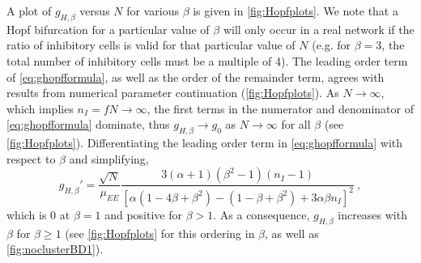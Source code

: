 \documentclass[reqno]{siamonline190516}
\begin{document}
A plot of $g_{H,\beta}$ versus $N$ for various $\beta$ is given in \cref{fig:Hopfplots}. We note that a Hopf bifurcation for a particular value of $\beta$ will only occur in a real network if the ratio of inhibitory cells is valid for that particular value of $N$ (e.g. for $\beta = 3$, the total number of inhibitory cells must be a multiple of 4). The leading order term of \cref{eq:ghopfformula}, as well as the order of the remainder term, agrees with results from numerical parameter continuation (\cref{fig:Hopfplots}). As $N \rightarrow \infty$, which implies $n_I = f N \rightarrow \infty$, the first terms in the numerator and denominator of \cref{eq:ghopfformula} dominate, thus $g_{H,\beta} \rightarrow g_0$ as $N \rightarrow \infty$ for all $\beta$ (see \cref{fig:Hopfplots}). Differentiating the leading order term in \cref{eq:ghopfformula} with respect to $\beta$ and simplifying,
\begin{equation}\label{eq:gprime}
g_{H,\beta}' = \frac{ \sqrt{N} }{ \mu_{EE} }
    \frac{ 
    3(\alpha+1)(\beta^2-1)(n_I-1)
    }
    { 
        \left[ \alpha(1 - 4 \beta + \beta^2) - (1 - \beta + \beta^2) + 3 \alpha \beta n_I \right]^2
    }\:,
\end{equation}
which is 0 at $\beta = 1$ and positive for $\beta > 1$. As a consequence, $g_{H,\beta}$ increases with $\beta$ for $\beta \geq 1$ (see \cref{fig:Hopfplots} for this ordering in $\beta$, as well as \cref{fig:noclusterBD1}). 
\end{document}
